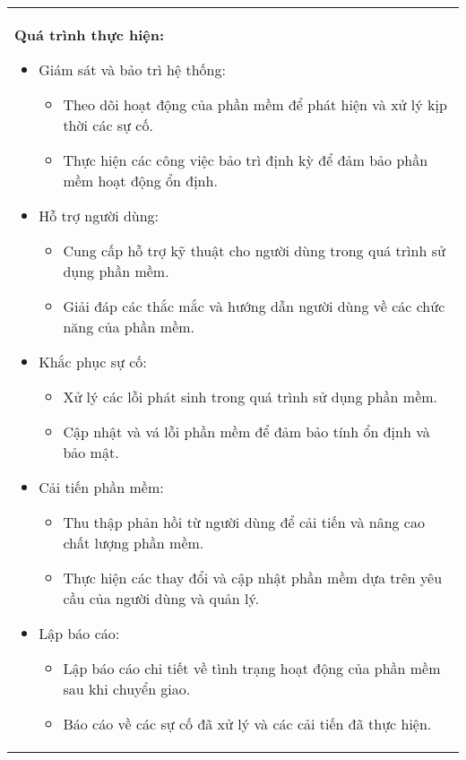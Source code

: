 \begin{longtable}{|p{\textwidth}|}
\begin{minipage}{\textwidth}
        \noindent\textbf{Quá trình thực hiện:}
        \begin{itemize}
            \item Giám sát và bảo trì hệ thống:
                  \begin{itemize}
                      \item Theo dõi hoạt động của phần mềm để phát hiện và xử lý kịp thời các sự cố.
                      \item Thực hiện các công việc bảo trì định kỳ để đảm bảo phần mềm hoạt động ổn định.
                  \end{itemize}
            \item Hỗ trợ người dùng:
                  \begin{itemize}
                      \item Cung cấp hỗ trợ kỹ thuật cho người dùng trong quá trình sử dụng phần mềm.
                      \item Giải đáp các thắc mắc và hướng dẫn người dùng về các chức năng của phần mềm.
                  \end{itemize}
            \item Khắc phục sự cố:
                  \begin{itemize}
                      \item Xử lý các lỗi phát sinh trong quá trình sử dụng phần mềm.
                      \item Cập nhật và vá lỗi phần mềm để đảm bảo tính ổn định và bảo mật.
                  \end{itemize}
            \item Cải tiến phần mềm:
                  \begin{itemize}
                      \item Thu thập phản hồi từ người dùng để cải tiến và nâng cao chất lượng phần mềm.
                      \item Thực hiện các thay đổi và cập nhật phần mềm dựa trên yêu cầu của người dùng và quản lý.
                  \end{itemize}
            \item Lập báo cáo:
                  \begin{itemize}
                      \item Lập báo cáo chi tiết về tình trạng hoạt động của phần mềm sau khi chuyển giao.
                      \item Báo cáo về các sự cố đã xử lý và các cải tiến đã thực hiện.
                  \end{itemize}
        \end{itemize}


\end{minipage}
\end{longtable}
